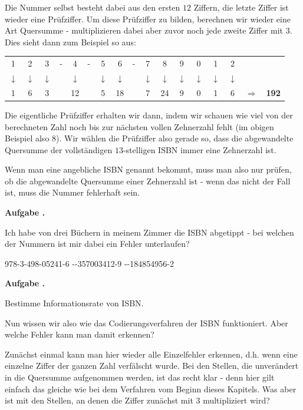 \documentclass[a4paper,ngerman,12pt]{scrartcl}
\theoremstyle{definition}
\theoremstyle{plain}
\theoremstyle{remark}
\newlength{\aufgabenskip}
\newcounter{aufgabennummer}
\newenvironment{aufgabe}[1]{
	\addtocounter{aufgabennummer}{1}
	\textbf{Aufgabe \theaufgabennummer.} \emph{#1} \par
}{\vspace{\aufgabenskip}}
\begin{document}
Die Nummer selbst besteht dabei aus den ersten $12$ Ziffern, die letzte Ziffer ist wieder eine Prüfziffer. Um diese Prüfziffer zu bilden, berechnen wir wieder eine Art Quersumme - multiplizieren dabei aber zuvor noch jede zweite Ziffer mit $3$. Dies sieht dann zum Beispiel so aus:

\begin{center}
	\begin{tabular}{ccccccccccccccccc}
		1 & 2 & 3 & - & 4 & - & 5 & 6 & - & 7 & 8 & 9 & 0 & 1 & 2 & & \\
		$\downarrow$ & $\downarrow$ & $\downarrow$ & & $\downarrow$ & & $\downarrow$ & $\downarrow$ & & $\downarrow$ & $\downarrow$ & $\downarrow$ & $\downarrow$ & $\downarrow$ & $\downarrow$ & & \\
		1 & 6 & 3 & & 12 & & 5 & 18 & & 7 & 24 & 9 & 0 & 1 & 6 & $\Rightarrow$ & \textbf{192}
	\end{tabular}
\end{center}

Die eigentliche Prüfziffer erhalten wir dann, indem wir schauen wie viel von der berechneten Zahl noch bis zur nächsten vollen Zehnerzahl fehlt (im obigen Beispiel also $8$). Wir wählen die Prüfziffer also gerade so, dass die abgewandelte Quersumme der vollständigen $13$-stelligen ISBN immer eine Zehnerzahl ist. 

Wenn man eine angebliche ISBN genannt bekommt, muss man also nur prüfen, ob die abgewandelte Quersumme einer Zehnerzahl ist - wenn das nicht der Fall ist, muss die Nummer fehlerhaft sein.

\begin{aufgabe}{}
	Ich habe von drei Büchern in meinem Zimmer die ISBN abgetippt - bei welchen der Nummern ist mir dabei ein Fehler unterlaufen?
	\begin{center}
		978-3-498-05241-6 \quad--357003412-9 \quad--184854956-2
	\end{center}
\end{aufgabe}

\begin{aufgabe}{}
	Bestimme Informationsrate von ISBN.
\end{aufgabe}

Nun wissen wir also wie das Codierungsverfahren der ISBN funktioniert. Aber welche Fehler kann man damit erkennen? 

Zunächst einmal kann man hier wieder alle Einzelfehler erkennen, d.h. wenn eine einzelne Ziffer der ganzen Zahl verfälscht wurde. Bei den Stellen, die unverändert in die Quersumme aufgenommen werden, ist das recht klar - denn hier gilt einfach das gleiche wie bei dem Verfahren vom Beginn dieses Kapitels. Was aber ist mit den Stellen, an denen die Ziffer zunächst mit $3$ multipliziert wird?
\end{document}
